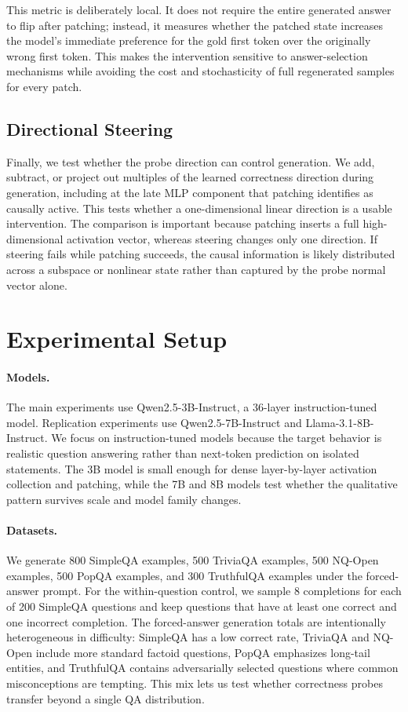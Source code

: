 \documentclass[11pt]{article}
\newcommand{\qwen}{Qwen2.5-3B-Instruct}
\begin{document}
This metric is deliberately local. It does not require the entire generated answer
to flip after patching; instead, it measures whether the patched state increases
the model's immediate preference for the gold first token over the originally
wrong first token. This makes the intervention sensitive to answer-selection
mechanisms while avoiding the cost and stochasticity of full regenerated samples
for every patch.

\subsection{Directional Steering}

Finally, we test whether the probe direction can control generation. We add,
subtract, or project out multiples of the learned correctness direction during
generation, including at the late MLP component that patching identifies as
causally active. This tests whether a one-dimensional linear direction is a usable
intervention. The comparison is important because patching inserts a full
high-dimensional activation vector, whereas steering changes only one direction.
If steering fails while patching succeeds, the causal information is likely
distributed across a subspace or nonlinear state rather than captured by the probe
normal vector alone.

\section{Experimental Setup}

\paragraph{Models.}
The main experiments use \qwen{}, a 36-layer instruction-tuned model. Replication
experiments use Qwen2.5-7B-Instruct and Llama-3.1-8B-Instruct. We focus on
instruction-tuned models because the target behavior is realistic question
answering rather than next-token prediction on isolated statements. The 3B model
is small enough for dense layer-by-layer activation collection and patching, while
the 7B and 8B models test whether the qualitative pattern survives scale and model
family changes.

\paragraph{Datasets.}
We generate 800 SimpleQA examples, 500 TriviaQA examples, 500 NQ-Open examples,
500 PopQA examples, and 300 TruthfulQA examples under the forced-answer prompt.
For the within-question control, we sample 8 completions for each of 200 SimpleQA
questions and keep questions that have at least one correct and one incorrect
completion. The forced-answer generation totals are intentionally heterogeneous in
difficulty: SimpleQA has a low correct rate, TriviaQA and NQ-Open include more
standard factoid questions, PopQA emphasizes long-tail entities, and TruthfulQA
contains adversarially selected questions where common misconceptions are tempting.
This mix lets us test whether correctness probes transfer beyond a single QA
distribution.
\end{document}
